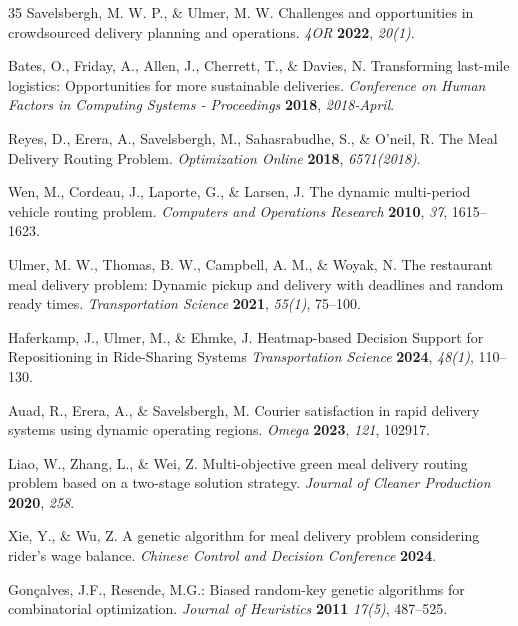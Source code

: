 \documentclass[runningheads]{llncs}
\begin{document}
%
%
% 
% 
%
\begin{thebibliography}{35}
Savelsbergh, M. W. P., \& Ulmer, M. W. Challenges and opportunities in crowdsourced delivery planning and operations. {\em 4OR} {\bf 2022}, {\em 20(1)}.

Bates, O., Friday, A., Allen, J., Cherrett, T., \& Davies, N. Transforming last-mile logistics: Opportunities for more sustainable deliveries. {\em Conference on Human Factors in Computing Systems - Proceedings} {\bf 2018}, {\em 2018-April}.

Reyes, D., Erera, A., Savelsbergh, M., Sahasrabudhe, S., \& O’neil, R. The Meal Delivery Routing Problem. {\em Optimization Online} {\bf 2018}, {\em 6571(2018)}.


Wen, M., Cordeau, J., Laporte, G., \& Larsen, J. The dynamic multi-period vehicle routing problem. {\em Computers and Operations Research} {\bf 2010}, {\em 37}, 1615--1623.

Ulmer, M. W., Thomas, B. W., Campbell, A. M., \& Woyak, N. The restaurant meal delivery problem: Dynamic pickup and delivery with deadlines and random ready times. {\em Transportation Science} {\bf 2021}, {\em 55(1)}, 75--100.

Haferkamp, J., Ulmer, M., \& Ehmke, J.  Heatmap-based Decision Support for Repositioning in Ride-Sharing Systems  {\em Transportation Science} {\bf 2024}, {\em 48(1)}, 110--130. 

Auad, R., Erera, A., \& Savelsbergh, M. Courier satisfaction in rapid delivery systems using dynamic operating regions. {\em Omega} {\bf 2023}, {\em 121}, 102917.

Liao, W., Zhang, L., \& Wei, Z. Multi-objective green meal delivery routing problem based on a two-stage solution strategy. {\em Journal of Cleaner Production} {\bf 2020}, {\em 258}.

Xie, Y., \& Wu, Z. A genetic algorithm for meal delivery problem considering rider’s wage balance. {\em Chinese Control and Decision Conference } {\bf 2024}.

Gonçalves, J.F., Resende, M.G.: Biased random-key genetic algorithms for combinatorial optimization. {\em Journal of Heuristics} {\bf 2011} {\em 17(5)}, 487--525.


\end{thebibliography}
\end{document}
